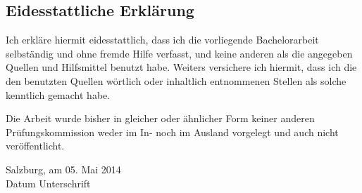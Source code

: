 \subsection*{Eidesstattliche Erklärung}
Ich erkläre hiermit eidesstattlich, dass ich die vorliegende Bachelorarbeit
selbständig und ohne fremde Hilfe verfasst, und keine anderen als die
angegeben Quellen und Hilfsmittel benutzt habe.
Weiters versichere ich hiermit, dass ich die den benutzten Quellen wörtlich
oder inhaltlich entnommenen Stellen als solche kenntlich gemacht habe.

Die Arbeit wurde bisher in gleicher oder ähnlicher Form keiner anderen
Prüfungskommission weder im In- noch im Ausland vorgelegt und auch nicht
veröffentlicht.

\vspace*{3cm}
Salzburg, am 05. Mai 2014\\
Datum
\hfill
Unterschrift
